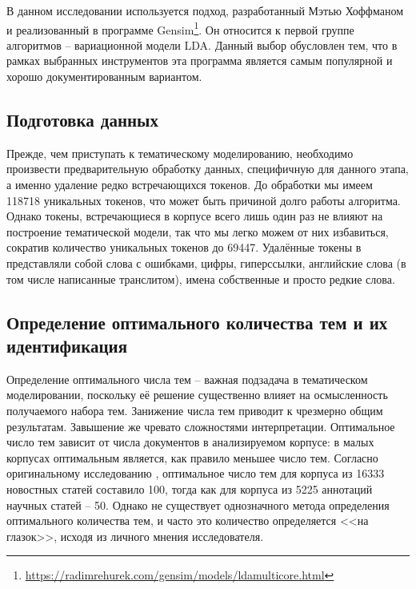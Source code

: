 В данном исследовании используется подход, разработанный Мэтью Хоффманом \cite{HoffmanBB10} и реализованный в программе Gensim\footnote{\href{https://radimrehurek.com/gensim/models/ldamulticore.html}{https://radimrehurek.com/gensim/models/ldamulticore.html}}. Он относится к первой группе алгоритмов -- вариационной модели LDA. Данный выбор обусловлен тем, что в рамках выбранных инструментов эта программа является самым популярной и хорошо документированным вариантом.


\subsection{Подготовка данных}
Прежде, чем приступать к тематическому моделированию, необходимо произвести предварительную обработку данных, специфичную для данного этапа, а именно удаление редко встречающихся токенов. До обработки мы имеем 118718 уникальных токенов, что может быть причиной долго работы алгоритма. Однако токены, встречающиеся в корпусе всего лишь один раз не влияют на построение тематической модели, так что мы легко можем от них избавиться, сократив количество уникальных токенов до 69447. Удалённые токены в представляли собой слова с ошибками, цифры, гиперссылки, английские слова (в том числе написанные транслитом), имена собственные и просто редкие слова.

\subsection{Определение оптимального количества тем и их идентификация}
Определение оптимального числа тем -- важная подзадача в тематическом моделировании, поскольку её решение существенно влияет на осмысленность получаемого набора тем. Занижение числа тем приводит к чрезмерно общим результатам. Завышение же чревато сложностями интерпретации. Оптимальное число тем зависит от числа документов в анализируемом корпусе: в малых корпусах оптимальным является, как правило меньшее число тем. Согласно оригинальному исследованию \cite{LDAOrigin}, оптимальное число тем для корпуса из 16333 новостных статей составило 100, тогда как для корпуса из 5225 аннотаций научных статей -- 50. Однако не существует однозначного метода определения оптимального количества тем, и часто это количество определяется <<на глазок>>, исходя из личного мнения исследователя. 

